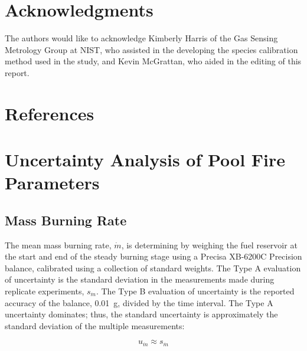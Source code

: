 \documentclass[12pt]{article}
\begin{document}
\section*{Acknowledgments}
The authors would like to acknowledge Kimberly Harris of the Gas Sensing Metrology Group at NIST, who assisted in the developing the species calibration method used in the study, and Kevin McGrattan, who aided in the editing of this report.

\clearpage

\section*{References}




\clearpage


\appendix
{}
\makeatletter
\newcommand{\section@cntformat}{Appendix:\ }
\makeatother

\section{Uncertainty Analysis of Pool Fire Parameters}\label{sec:Uncertainty_Pool_Fire_Parameters}

\subsection{Mass Burning Rate}
\label{ssec:Mass_Burning_Flux}

The mean mass burning rate, $\dot{m}$, is determining by weighing the fuel reservoir at the start and end of the steady burning stage using a Precisa XB-6200C Precision balance, calibrated using a collection of standard weights. The Type A evaluation of uncertainty is the standard deviation in the measurements made during replicate experiments, $s_{\scriptscriptstyle \dot{m}}$. The Type B evaluation of uncertainty is the reported accuracy of the balance, 0.01~g, divided by the time interval. The Type A uncertainty dominates; thus, the standard uncertainty is approximately the standard deviation of the multiple measurements:

\begin{equation}
\label{eq:mass_rate_uncertainty}
u_{\scriptscriptstyle \dot{m}} \approx s_{\scriptscriptstyle \dot{m} }
\end{equation}
\end{document}
